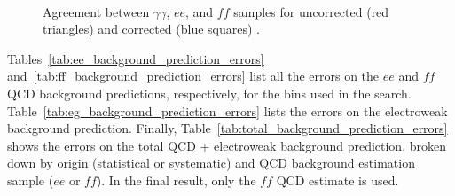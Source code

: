\documentclass[dissertation_bw.tex]{subfiles}
\begin{document}
\begin{figure}
	\\
	\caption{Agreement between $\gamma\gamma$, $ee$, and $\mathit{ff}$ samples for uncorrected (red triangles) and corrected (blue squares) \MET.}
	\label{fig:Type-I_MET_corrections_vs_uncorrected_MET_zoom}
\end{figure}

Tables~\ref{tab:ee_background_prediction_errors} and~\ref{tab:ff_background_prediction_errors} list all the errors on the $ee$ and $\mathit{ff}$ QCD background predictions, respectively, for the \MET bins used in the search.  Table~\ref{tab:eg_background_prediction_errors} lists the errors on the electroweak background prediction.  Finally, Table~\ref{tab:total_background_prediction_errors} shows the errors on the total QCD + electroweak background prediction, broken down by origin (statistical or systematic) and QCD background estimation sample ($ee$ or $\mathit{ff}$).  In the final result, only the $\mathit{ff}$ QCD estimate is used.
\end{document}

